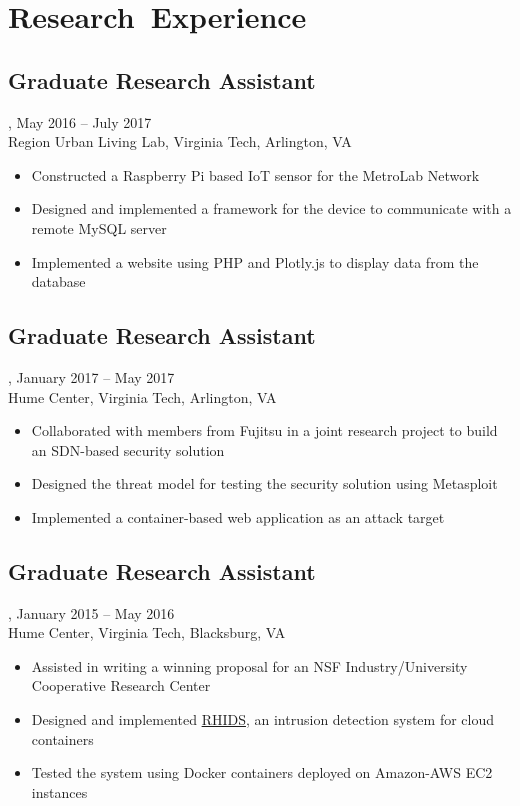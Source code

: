 \section{Research~Experience}
\subsection{Graduate Research Assistant}, May 2016 -- July 2017\\
Region Urban Living Lab, Virginia Tech, Arlington, VA
\begin{itemize}
\item Constructed a Raspberry Pi based IoT sensor for the MetroLab Network
\item Designed and implemented a framework for the device to communicate with a remote MySQL server
\item Implemented a website using PHP and Plotly.js to display data from the database
\end{itemize}
\subsection{Graduate Research Assistant}, January 2017 -- May 2017\\
Hume Center,
Virginia Tech, Arlington, VA
\begin{itemize}
\item Collaborated with members from Fujitsu in a joint research project to build an SDN-based security solution
\item Designed the threat model for testing the security solution using Metasploit
\item Implemented a container-based web application as an attack target
\end{itemize}
\subsection{Graduate Research Assistant}, January 2015 -- May 2016\\
Hume Center, Virginia Tech, Blacksburg, VA
\begin{itemize}
\item Assisted in writing a winning proposal for an NSF Industry/University Cooperative Research Center
\item Designed and implemented \href{https://github.com/amrabed/rhids}{RHIDS}, an intrusion detection system for cloud containers
\item Tested the system using Docker containers deployed on Amazon-AWS EC2 instances
\end{itemize}

